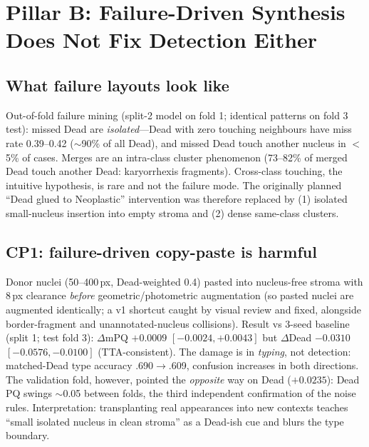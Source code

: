 \documentclass[11pt]{article}
\begin{document}
\section{Pillar B: Failure-Driven Synthesis Does Not Fix Detection Either}
\label{sec:pillarB}

\subsection{What failure layouts look like}
Out-of-fold failure mining (split-2 model on fold 1; identical patterns on fold 3 test):
missed Dead are \emph{isolated}---Dead with zero touching neighbours have miss rate 0.39--0.42
($\sim$90\% of all Dead), and missed Dead touch another nucleus in $<$5\% of cases. Merges are
an intra-class cluster phenomenon (73--82\% of merged Dead touch another Dead: karyorrhexis
fragments). Cross-class touching, the intuitive hypothesis, is rare and not the failure mode.
The originally planned ``Dead glued to Neoplastic'' intervention was therefore replaced by
(1) isolated small-nucleus insertion into empty stroma and (2) dense same-class clusters.

\subsection{CP1: failure-driven copy-paste is harmful}
Donor nuclei (50--400\,px, Dead-weighted 0.4) pasted into nucleus-free stroma with 8\,px
clearance \emph{before} geometric/photometric augmentation (so pasted nuclei are augmented
identically; a v1 shortcut caught by visual review and fixed, alongside border-fragment and
unannotated-nucleus collisions). Result vs 3-seed baseline (split 1; test fold 3):
$\Delta$mPQ $+0.0009$ $[-0.0024,+0.0043]$ but $\Delta$Dead \textbf{$-0.0310$}
$[-0.0576,-0.0100]$ (TTA-consistent). The damage is in \emph{typing}, not detection: matched-Dead
type accuracy .690$\rightarrow$.609, confusion increases in both directions. The
validation fold, however, pointed the \emph{opposite} way on Dead ($+0.0235$): Dead PQ swings $\sim$0.05
between folds, the third independent confirmation of the noise rules. Interpretation:
transplanting real appearances into new contexts teaches ``small isolated nucleus in clean
stroma'' as a Dead-ish cue and blurs the type boundary.
\end{document}
